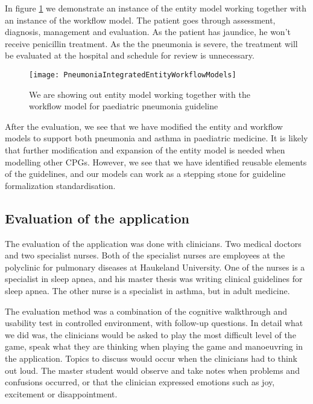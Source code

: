 In figure \ref{fig:PneumoniaPneumoniaIntegratedEntityWorkflowModels} we demonstrate an instance of the entity model working together with an instance of the workflow model. The patient goes through assessment, diagnosis, management and evaluation. As the patient has jaundice, he won't receive penicillin treatment. As the the pneumonia is severe, the treatment will be evaluated at the hospital and schedule for review is unnecessary. 
\begin{figure}[h!]
	\label{fig:PneumoniaPneumoniaIntegratedEntityWorkflowModels}
	\texttt{[image: PneumoniaIntegratedEntityWorkflowModels]}
	\caption {We are showing out entity model working together with the workflow model for paediatric pneumonia guideline \parencite{RepublicofKeny2016}}	
\end{figure}

After the evaluation, we see that we have modified the entity and workflow models to support both pneumonia and asthma in paediatric medicine. It is likely that further modification and expansion of the entity model is needed when modelling other CPGs. However, we see that we have identified reusable elements of the guidelines, and our models can work as a stepping stone for guideline formalization standardisation.


\subsection{Evaluation of the application}
The evaluation of the application was done with clinicians.	Two medical doctors and two specialist nurses. Both of the specialist nurses are employees at the polyclinic for pulmonary diseases at Haukeland University. One of the nurses is a specialist in sleep apnea, and his master thesis was writing clinical guidelines for sleep apnea. The other nurse is a specialist in asthma, but in adult medicine.

The evaluation method was a combination of the cognitive walkthrough and usability test in controlled environment, with follow-up questions. In detail what we did was, the clinicians would be asked to play the most difficult level of the game, speak what they are thinking when playing the game and manoeuvring in the application. Topics to discuss would occur when the clinicians had to think out loud. The master student would observe and take notes when problems and confusions occurred, or that the clinician expressed emotions such as joy, excitement or disappointment.

